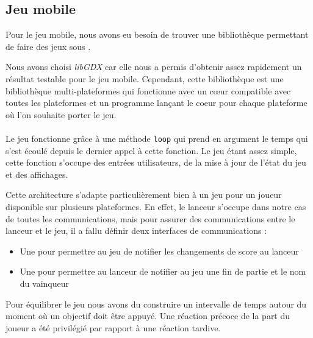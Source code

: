 \subsection{Jeu mobile}
Pour le jeu mobile, nous avons eu besoin de trouver une bibliothèque permettant de faire des jeux sous \android{}.

Nous avons choisi \textit{libGDX} car elle nous a permis d'obtenir assez rapidement un résultat testable pour le jeu mobile. Cependant, cette bibliothèque est une bibliothèque multi-plateformes qui fonctionne avec un c\oe{}ur compatible avec toutes les plateformes et un programme lançant le coeur pour chaque plateforme où l'on souhaite porter le jeu.

\paragraph{}
Le jeu fonctionne grâce à une méthode \verb!loop! qui prend en argument le temps qui s'est écoulé depuis le dernier appel à cette fonction. Le jeu étant assez simple, cette fonction s'occupe des entrées utilisateurs, de la mise à jour de l'état du jeu et des affichages.

Cette architecture s'adapte particulièrement bien à un jeu pour un joueur disponible sur plusieurs plateformes. En effet, le lanceur \android{} s'occupe dans notre cas de toutes les communications, mais pour assurer des communications entre le lanceur et le jeu, il a fallu définir deux interfaces de communications :
\begin{itemize}
\item Une pour permettre au jeu de notifier les changements de score au lanceur
\item Une pour permettre au lanceur de notifier au jeu une fin de partie et le nom du vainqueur
\end{itemize}

Pour équilibrer le jeu nous avons du construire un intervalle de temps autour du moment où un objectif doit être appuyé. Une réaction précoce de la part du joueur a été privilégié par rapport à une réaction tardive.
